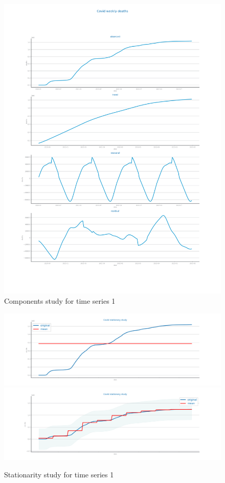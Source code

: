 \documentclass[10pt]{extarticle}
\begin{document}
\begin{figure}[H]
\centering\includegraphics[scale=0.50]{images/dataset1/time_series/Covid_components_study.png}
\caption{Components study for time series 1}
\end{figure}


\begin{figure}[H]
\centering\includegraphics[scale=0.6]{images/dataset1/time_series/Covid_stationarity_study_1.png}
\includegraphics[scale=0.6]{images/dataset1/time_series/Covid_stationarity_study_2.png}
\caption{Stationarity study for time series 1}
\end{figure}
\end{document}
